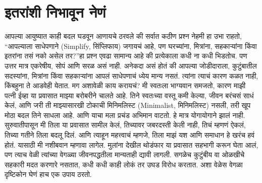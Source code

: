  \chapter{इतरांशी निभावून नेणं}
आपल्या आयुष्यात काही बदल घडवून आणायचे ठरवले की सर्वात कठीण प्रश्न नेहमी हा उभा राहतो,  “आपल्याला साधेपणाने (Simplify,  सिंप्लिफाय) जगायचं आहे, पण घरच्यांना, मित्रांना, सहकाऱ्यांना किंवा इतरांना तसं नको असेल तर?”हा प्रश्न एवढा सामान्य आहे की प्रत्येकाला कधी ना कधी भिडतोच. पण उत्तर मात्र एकरेषीय, सोपं आणि सरळ असं नाही.
अनेकदा असं होतं की आपल्या जोडीदाराला, कुटुंबातील सदस्यांना, मित्रांना किंवा सहकाऱ्यांना आपलं साधेपणाचं ध्येय मान्य नसतं. त्यांना त्याचं कारण कळत नाही, किंबहुना ते आडवेही येतात. मग अशावेळी काय करायचं?
मी स्वतःला भाग्यवान समजतो, कारण माझी पत्नी ईव्हा या प्रवासात माझ्या बरोबरीने चालते आहे. तिने स्वतःच्या वस्तू कमी केल्या, जीवन बरंचसं साधं केलं, आणि जरी ती माझ्यासारखी टोकाची मिनिमलिस्ट (Minimalist,  मिनिमलिस्ट) नसली, तरी खूप मोठा बदल तिने साधला आहे. आणि याचा मला प्रचंड अभिमान वाटतो.
हे मात्र योगायोगाने झालं नाही. सुरुवातीपासून मी तिला या प्रवासात सामील केलं, तिच्यावर जबरदस्ती केली नाही,
 तिचं म्हणणं ऐकलं, तिच्या गतीने तिला बदलू दिलं. आणि त्याहून महत्त्वाचं म्हणजे,  तिला माझं यश आणि समाधान हे खरंच हवं होतं. यासाठी मी नशीबवान म्हणावा लागेल. मुलांना देखील थोडंफार या प्रवासात सहभागी करून घेता आलं,
 पण त्याच वेळी त्यांच्या वेगळ्या जीवनपद्धतीला मान्यताही द्यावी लागली. सगळेच कुटुंबीय वा ओळखीचे सहकारी मदत करणारे नसतात, कधी कधी काही लोकं तर उघड विरोध करतात. अशा वेळेस वेगळा दृष्टिकोन घेणं हाच एक उपाय ठरतो.
